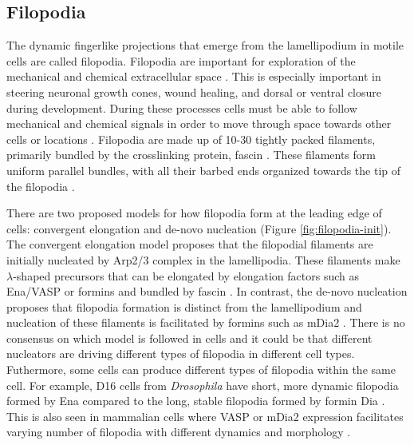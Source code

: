 \subsection{Filopodia}\label{filopodia-intro}
The dynamic fingerlike projections that emerge from the lamellipodium in motile cells are called filopodia. Filopodia are important for exploration of the mechanical and chemical extracellular space \citep{mattila_filopodia:_2008}. This is especially important in steering neuronal growth cones, wound healing, and dorsal or ventral closure during development. During these processes cells must be able to follow mechanical and chemical signals in order to move through space towards other cells or locations \citep{bornschlogl_how_2013}. Filopodia are made up of 10-30 tightly packed filaments, primarily bundled by the crosslinking protein, fascin \citep{vignjevic_role_2006, mellor_role_2010}. These filaments form uniform parallel bundles, with all their barbed ends organized towards the tip of the filopodia \citep{bornschlogl_how_2013}.

There are two proposed models for how filopodia form at the leading edge of cells: convergent elongation \citep{yang_filopodia_2011} and de-novo nucleation \citep{faix_filopodia:_2009} (Figure \ref{fig:filopodia-init}). The convergent elongation model proposes that the filopodial filaments are initially nucleated by Arp2/3 complex in the lamellipodia. These filaments make $\lambda$-shaped precursors that can be elongated by elongation factors such as Ena/VASP or formins and bundled by fascin \citep{svitkina_mechanism_2003, small_lamellipodium:_2002}. In contrast, the de-novo nucleation proposes that filopodia formation is distinct from the lamellipodium and nucleation of these filaments is facilitated by formins such as mDia2 \citep{faix_making_2006,mellor_role_2010}. There is no consensus on which model is followed in cells and it could be that different nucleators are driving different types of filopodia in different cell types. Futhermore, some cells can produce different types of filopodia within the same cell. For example, D16 cells from \textit{Drosophila} have short, more dynamic filopodia formed by Ena compared to the long, stable filopodia formed by formin Dia \citep{bilancia_enabled_2014}. This is also seen in mammalian cells where VASP or mDia2 expression facilitates varying number of filopodia with different dynamics and morphology \citep{barzik_ena/vasp_2014}. 

